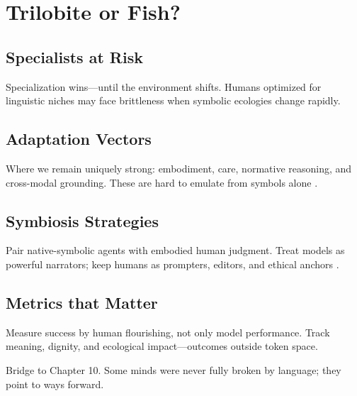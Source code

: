 \chapter{Trilobite or Fish?}

\section{Specialists at Risk}

Specialization wins—until the environment shifts. Humans optimized for linguistic niches may face brittleness when symbolic ecologies change rapidly.

\section{Adaptation Vectors}

Where we remain uniquely strong: embodiment, care, normative reasoning, and cross-modal grounding. These are hard to emulate from symbols alone \parencite{merleau-ponty1945phenomenology,brewer2011meditation}.

\section{Symbiosis Strategies}

Pair native-symbolic agents with embodied human judgment. Treat models as powerful narrators; keep humans as prompters, editors, and ethical anchors \parencite{tegmark2017life}.

\section{Metrics that Matter}

Measure success by human flourishing, not only model performance. Track meaning, dignity, and ecological impact—outcomes outside token space.

\bigskip
\noindent Bridge to Chapter 10. Some minds were never fully broken by language; they point to ways forward.
